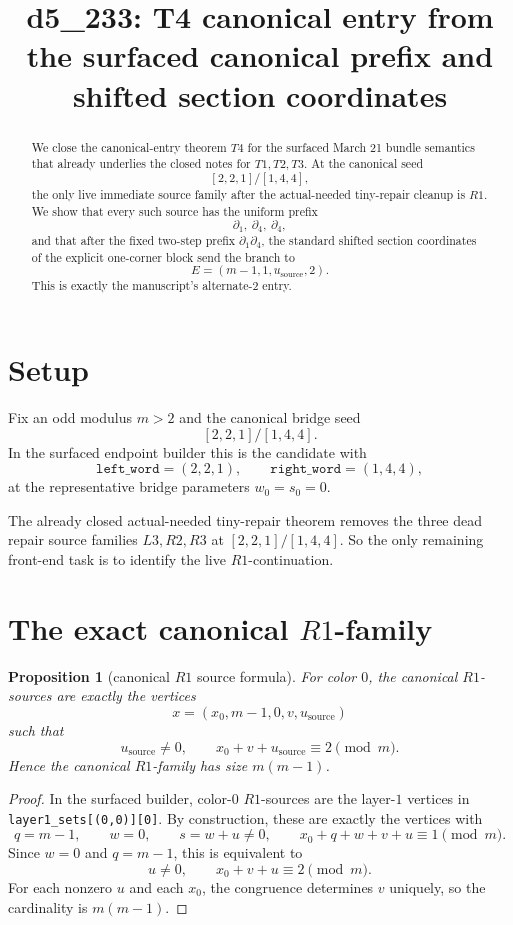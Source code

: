\documentclass[11pt]{article}
\title{d5\_233: T4 canonical entry from the surfaced canonical prefix and shifted section coordinates}
\author{}
\date{}
\newtheorem{proposition}[theorem]{Proposition}
\newcommand{\CanSeed}{[2,2,1]/[1,4,4]}
\begin{document}
\maketitle

\begin{abstract}
We close the canonical-entry theorem \(T4\) for the surfaced March 21 bundle
semantics that already underlies the closed notes for \(T1,T2,T3\).
At the canonical seed
\[
\CanSeed,
\]
the only live immediate source family after the actual-needed tiny-repair
cleanup is \(R1\).
We show that every such source has the uniform prefix
\[
\partial_1,\ \partial_4,\ \partial_4,
\]
and that after the fixed two-step prefix \(\partial_1\partial_4\), the
standard shifted section coordinates of the explicit one-corner block send the
branch to
\[
E=(m-1,1,u_{\mathrm{source}},2).
\]
This is exactly the manuscript's alternate-\(2\) entry.
\end{abstract}

\section{Setup}

Fix an odd modulus \(m>2\) and the canonical bridge seed
\[
\CanSeed.
\]
In the surfaced endpoint builder this is the candidate with
\[
\texttt{left\_word}=(2,2,1),\qquad \texttt{right\_word}=(1,4,4),
\]
at the representative bridge parameters \(w_0=s_0=0\).

The already closed actual-needed tiny-repair theorem removes the three dead
repair source families \(L3,R2,R3\) at \(\CanSeed\).  So the only remaining
front-end task is to identify the live \(R1\)-continuation.

\section{The exact canonical \(R1\)-family}

\begin{proposition}[canonical \(R1\) source formula]
For color \(0\), the canonical \(R1\)-sources are exactly the vertices
\[
x=(x_0,m-1,0,v,u_{\mathrm{source}})
\]
such that
\[
u_{\mathrm{source}}\neq 0,
\qquad
x_0+v+u_{\mathrm{source}}\equiv 2 \pmod m.
\]
Hence the canonical \(R1\)-family has size \(m(m-1)\).
\end{proposition}

\begin{proof}
In the surfaced builder, color-\(0\) \(R1\)-sources are the layer-\(1\)
vertices in \texttt{layer1\_sets[(0,0)][0]}.  By construction, these are exactly
the vertices with
\[
q=m-1,\qquad w=0,\qquad s=w+u\neq 0,
\qquad x_0+q+w+v+u\equiv 1 \pmod m.
\]
Since \(w=0\) and \(q=m-1\), this is equivalent to
\[
u\neq 0,
\qquad
x_0+v+u\equiv 2 \pmod m.
\]
For each nonzero \(u\) and each \(x_0\), the congruence determines \(v\)
uniquely, so the cardinality is \(m(m-1)\).
\end{proof}
\end{document}
